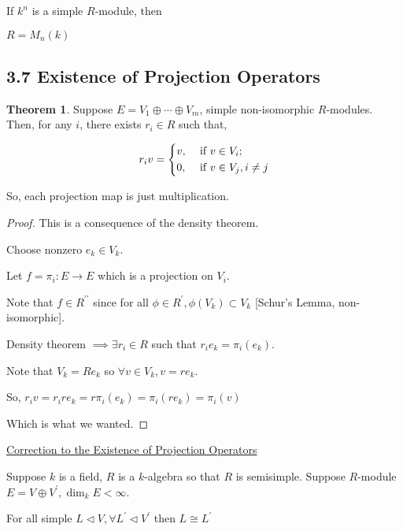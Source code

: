 \documentclass{article}
\theoremstyle{definition}
\newtheorem{theorem}{Theorem}
\begin{document}
If \(k^n\) is a simple \(R\)-module, then

\(R = M_n(k)\)

\subsection*{3.7 Existence of Projection Operators}

\begin{theorem}

    Suppose \(E = V_1 \oplus \cdots \oplus V_m\), simple non-isomorphic \(R\)-modules. Then, for any \(i\), there exists \(r_i\in R\) such that,

    \[
        r_i v = \begin{dcases}
            v, &\text{ if } v\in V_i ;\\
            0, &\text{ if } v\in V_j, i \neq j
            \end{dcases}
    \]

    So, each projection map is just multiplication.

\end{theorem}
    
\begin{proof}
    This is a consequence of the density theorem.

    Choose nonzero \(e_k \in V_k\).

    Let \(f = \pi_i : E\to E\) which is a projection on \(V_i\).

    Note that \(f\in R^{\prime\prime} \) since for all \(\phi \in R^{\prime} , \phi(V_k) \subset V_k\) [Schur's Lemma, non-isomorphic].

    Density theorem \(\implies \exists r_i \in R\) such that \(r_i e_k = \pi_i (e_k)\).

    Note that \(V_k = Re_k\) so \(\forall v\in V_k, v = r e_k\). 

    So, \(r_i v = r_i r e_k = r\pi_i(e_k) = \pi_i (r e_k) = \pi_i(v)\) 

    Which is what we wanted.

\end{proof}

\underline{Correction to the Existence of Projection Operators}

Suppose \(k\) is a field, \(R\) is a \(k\)-algebra so that \(R\) is semisimple. Suppose \(R\)-module \(E = V \oplus V^{\prime}, \dim_k E < \infty\).

For all simple \(L \triangleleft V, \forall L^{\prime} \triangleleft V^{\prime}\) then \(L \cong L^{\prime}\) 
\end{document}
